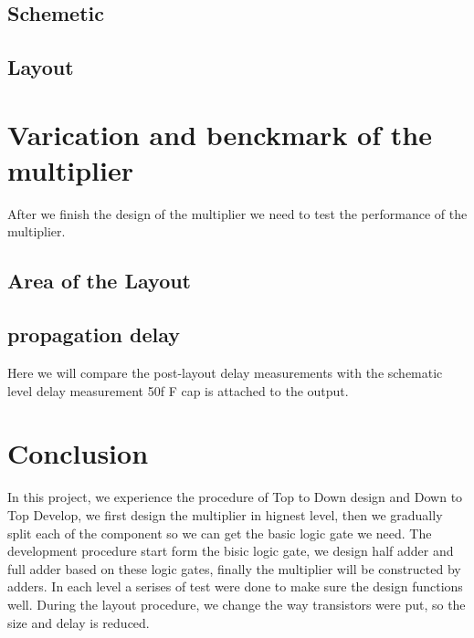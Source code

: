 \documentclass[conference]{IEEEtran}
\begin{document}
\subsection{Schemetic}



\subsection{Layout}

\section{Varication and benckmark of the multiplier}
\label{test}


After we finish the design of the multiplier we need to test the performance of the multiplier.

\subsection{Area of the Layout}

\subsection{propagation delay}

Here we will compare the post-layout delay measurements with the schematic level delay measurement 50f F cap is attached to the output.

\section{Conclusion}

In this project, we experience the procedure of Top to Down design and Down to Top Develop, we first design the multiplier in hignest level, then we gradually split each of the component so we can get the basic logic gate we need. The development procedure start form the bisic logic gate, we design half adder and full adder based on these logic gates, finally the multiplier will be constructed by adders. In each level a serises of test were done to make sure the design functions well. During the layout procedure, we change the way transistors were put, so the size and delay is reduced.


% 


\end{document}
